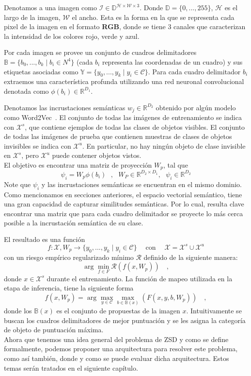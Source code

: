 Denotamos a una imagen como $\mathcal{I} \in \mathbb{D}^{\mathcal{H} \times \mathcal{W} \times 3}$. Donde $\mathbb{D} = \{0,...,255\}$, $\mathcal{H}$  es el largo de la imagen, $\mathcal{W}$ el ancho. Esta es la forma en la que se representa cada pixel de la imagen en el formato \textbf{RGB}, donde se tiene 3 canales que caracterizan la intensidad de los colores rojo, verde y azul. 

Por cada imagen se provee un conjunto de cuadros delimitadores $\mathbb{B} = \{b_0,...,b_k\mid b_i \in N^4\}$ (cada $b_i$ representa las coordenadas de un cuadro) y sus etiquetas asociadas como $\mathbb{Y} = \{y_0,...,y_k\mid y_i \in \mathcal{C}\}$. Para cada cuadro delimitador $b_i$ extraemos una característica profunda utilizando una red neuronal convolucional denotada como $\phi(b_i) \in \mathbb{R}^{D_1}$. 

Denotamos las incrustaciones semánticas $w_j \in \mathbb{R}^{D_2}$ obtenido por algún modelo como Word2Vec~\cite{mikolov2013distributed}. El conjunto de todas las imágenes de entrenamiento se indica con $\mathcal{X}^s$, que contiene ejemplos de todas las clases de objetos visibles.  El conjunto de todas las imágenes de prueba que contienen muestras de clases de objetos invisibles se indica con  $\mathcal{X}^u$. En particular, no hay ningún objeto de clase invisible en $\mathcal{X}^s$, pero $\mathcal{X}^u$ puede contener objetos vistos.\\

El objetivo es encontrar una matriz de proyección $W_p$, tal que 
\[ \psi_i = W_p\phi(b_i) \:\:\:,\:\:\: W_P \in \mathbb{R}^{D_2 \times D_1},\:\:\: \psi_i \in \mathbb{R}^{D_2} \] 
Note que $\psi_i$ y las incrustaciones semánticas se encuentran en el mismo dominio. Como mencionamos en secciones anteriores, el espacio vectorial semántico, tiene una gran capacidad de capturar similitudes semánticas. Por lo cual, resulta clave encontrar una matriz que para cada cuadro delimitador se proyecte lo más cerca posible a la incrustación semántica de su clase. 

El resultado es una función 
\[f : \mathcal{X}, W_p  \to \{y_0,...,y_k\mid y_i \in \mathcal{C}\} \quad \operatorname{con}\quad \mathcal{X} =  \mathcal{X}^s \cup \mathcal{X}^u\] 
con un riesgo empírico regularizado mínimo $\mathcal{R}$ definido de la siguiente manera: 
\[ \arg_{}\min_{f \in F} \mathcal{R}(f(x,W_p))\quad, \] 
donde $x \in \mathcal{X}^s$ durante el entrenamiento. La función de mapeo utilizada en la etapa de inferencia, tiene la siguiente forma \[ f(x,W_p) = \arg_{}\max_{y \in \mathcal{C}}\max_{b \in \mathbb{B}(x)} (F(x,y,b,W_p)) \quad,\] donde los $\mathbb{B}(x)$ es el conjunto de propuestas de la imagen $x$. Intuitivamente se buscan los cuadros delimitadores de mejor puntuación y se les asigna la categoría de objeto de puntuación máxima.\\

Ahora que tenemos una idea general del problema de ZSD y como se define formalmente, podemos proponer una arquitectura para resolver este problema, como así también, donde y como se puede evaluar dicha arquitectura. Estos temas serán tratados en el siguiente capítulo.